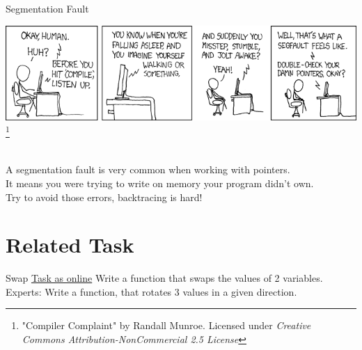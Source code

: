 \begin{frame}{Segmentation Fault}
	\centerline{\includegraphics[scale=.4]{../img/compiler_complaint.png}
		\let\thefootnote\relax\footnote{\tiny "Compiler Complaint" by Randall Munroe. Licensed under \textit{Creative Commons Attribution-NonCommercial 2.5 License}}} \ \\[.5cm]
	A segmentation fault is very common when working with pointers.\\
	It means you were trying to write on memory your program didn't own. \\
	Try to avoid those errors, backtracing is hard!
\end{frame}

\section{Related Task}

\begin{frame}{Swap}
    \href{http://fsr.github.io/c-lessons/exercises/23_swap.html}{Task as online}
    \newline
    Write a function that swaps the values of 2 variables.
    \newline 
    \newline
    Experts: Write a function, that rotates 3 values in a given direction.
\end{frame}





